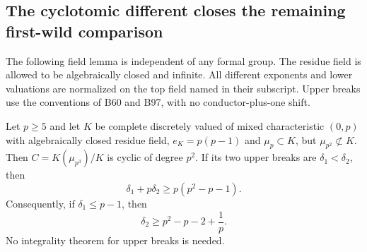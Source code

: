\subsection{The cyclotomic different closes the remaining first-wild comparison}

The following field lemma is independent of any formal group.
The residue field is allowed to be algebraically closed and infinite.
All different exponents and lower valuations are normalized on the
top field named in their subscript. Upper breaks use the conventions
of B60 and B97, with no conductor-plus-one shift.

\begin{lemma}
\label{lem:B-RD98-different}
Let $p\ge5$ and let $K$ be complete discretely valued of mixed
characteristic $(0,p)$ with algebraically closed residue field,
$e_K=p(p-1)$ and $\mu_p\subset K$, but $\mu_{p^2}\not\subset K$.
Then $C=K(\mu_{p^3})/K$ is cyclic of degree $p^2$. If its two
upper breaks are $\delta_1<\delta_2$, then
\[
            \delta_1+p\delta_2\ge p(p^2-p-1).
                                                        \tag{B-RD98.1}
\]
Consequently, if $\delta_1\le p-1$, then
\[
                     \delta_2\ge p^2-p-2+\frac1p.
                                                        \tag{B-RD98.2}
\]
No integrality theorem for upper breaks is needed.
\end{lemma}
